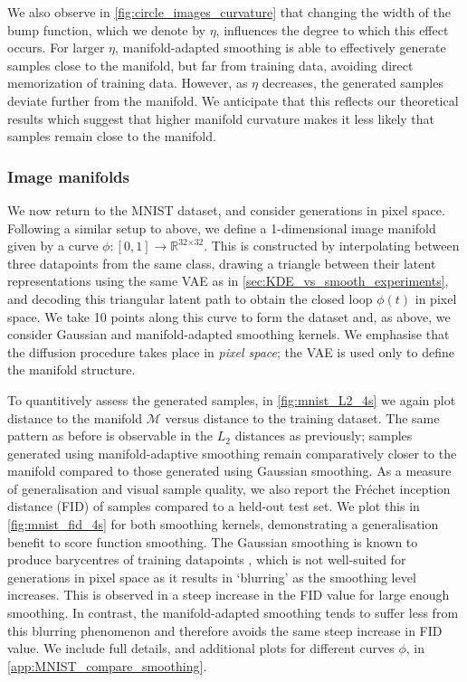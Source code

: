 \documentclass[10pt]{article}
\theoremstyle{plain}
\theoremstyle{definition}
\theoremstyle{remark}
\newcommand{\R}{\mathbb{R}}
\begin{document}
We also observe in \cref{fig:circle_images_curvature} that changing the width of the bump function, which we denote by $\eta$, influences the degree to which this effect occurs. For larger $\eta$, manifold-adapted smoothing is able to effectively generate samples close to the manifold, but far from training data, avoiding direct memorization of training data. However, as $\eta$ decreases, the generated samples deviate further from the manifold. We anticipate that this reflects our theoretical results which suggest that higher manifold curvature makes it less likely that samples remain close to the manifold.




\subsubsection{Image manifolds}
\label{sec:image manifold}
We now return to the MNIST dataset, and consider generations in pixel space. Following a similar setup to above, we define a 1-dimensional image manifold given by a curve $\phi : [0,1] \to \R^{\text{32} \times \text{32}}$. This is constructed by interpolating between three datapoints from the same class, drawing a triangle between their latent representations using the same VAE as in \cref{sec:KDE_vs_smooth_experiments}, and decoding this triangular latent path to obtain the closed loop $\phi(t)$ in pixel space. We take 10 points along this curve to form the dataset and, as above, we consider Gaussian and manifold-adapted smoothing kernels. We emphasise that the diffusion procedure takes place in \textit{pixel space}; the VAE is used only to define the manifold structure.

To quantitively assess the generated samples, in \cref{fig:mnist_L2_4s} we again plot distance to the manifold $\mathcal{M}$ versus distance to the training dataset. The same pattern as before is observable in the $L_2$ distances as previously; samples generated using manifold-adaptive smoothing remain comparatively closer to the manifold compared to those generated using Gaussian smoothing. As a measure of generalisation and visual sample quality, we also report the Fréchet inception distance (FID) \citep{heusel17_FID} of samples compared to a held-out test set. We plot this in \cref{fig:mnist_fid_4s} for both smoothing kernels, demonstrating a generalisation benefit to score function smoothing. 
The Gaussian smoothing is known to produce barycentres of training datapoints \citep{scarvelis2023closedformdiffusionmodels}, which is not well-suited for generations in pixel space as it results in `blurring' as the smoothing level increases. This is observed in a steep increase in the FID value for large enough smoothing. In contrast, the manifold-adapted smoothing tends to suffer less from this blurring phenomenon and therefore avoids the same steep increase in FID value. We include full details, and additional plots for different curves $\phi$, in \cref{app:MNIST_compare_smoothing}.
\end{document}
